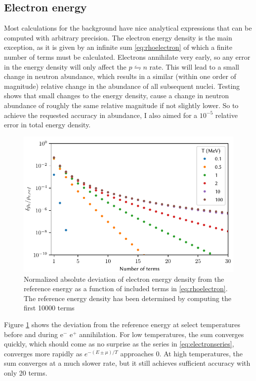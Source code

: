 \subsection{Electron energy}
Most calculations for the background have nice analytical expressions that can be computed with arbitrary precision. The electron energy density is the main exception, as it is given by an infinite sum \eqref{eq:rhoelectron} of which a finite number of terms must be calculated. Electrons annihilate very early, so any error in the energy density will only affect the $p\leftrightharpoons n$ rate. This will lead to a small change in neutron abundance, which results in a similar (within one order of magnitude) relative change in the abundance of all subsequent nuclei. 
Testing shows that small changes to the energy density, cause a change in neutron abundance of roughly the same relative magnitude if not slightly lower. So to achieve the requested accuracy in abundance, I also aimed for a $10^{-5}$ relative error in total energy density. 
\begin{figure}[ht!]
    \includegraphics[width=5.1in]{figures/Besselaccuracy.pdf}
    \caption{Normalized absolute deviation of electron energy density from the reference energy as a function of included terms in \eqref{eq:rhoelectron}. The reference energy density has been determined by computing the first 10000 terms}
    \label{fig:Besselaccuracy}
\end{figure}

Figure \ref{fig:Besselaccuracy} shows the deviation from the reference energy at select temperatures before and during e$^-$ e$^+$ annihilation. For low temperatures, the sum converges quickly, which should come as no surprise as the series in \eqref{eq:electronseries}, converges more rapidly as $e^{-(E\pm\mu)/T}$ approaches 0. At high temperatures, the sum converges at a much slower rate, but it still achieves sufficient accuracy with only 20 terms.

